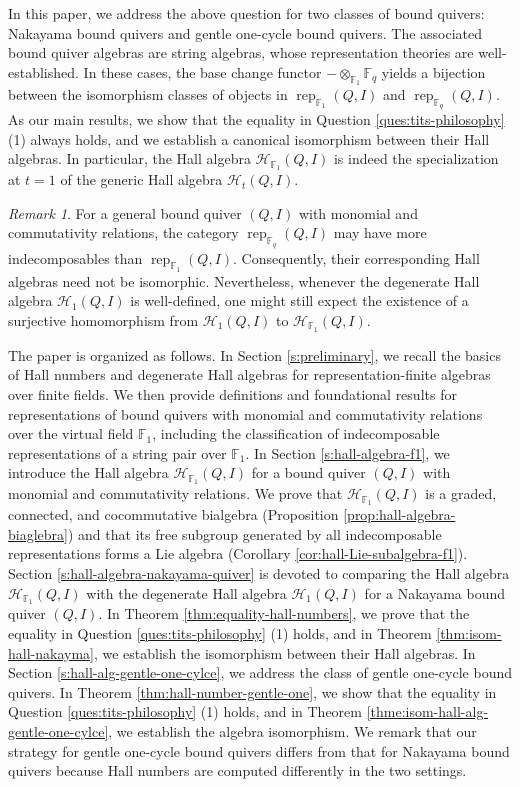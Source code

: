 \documentclass[12pt]{amsart}
\theoremstyle{remark}
\newtheorem{remark}[theorem]{Remark}
\theoremstyle{definition}
\numberwithin{equation}{section}
\begin{document}
In this paper, we address the above question for two classes of bound quivers: Nakayama bound quivers and gentle one-cycle bound quivers. The associated bound quiver algebras are string algebras, whose representation theories are well-established. In these cases, the base change functor $-\otimes_{\mathbb{F}_1}\mathbb{F}_q$ yields a bijection between the isomorphism classes of objects in $\operatorname{rep}_{\mathbb{F}_1}(Q,I)$ and $\operatorname{rep}_{\mathbb{F}_q}(Q,I)$. As our main results, we show that the equality in Question \ref{ques:tits-philosophy} (1) always holds, and we establish a canonical isomorphism between their Hall algebras. In particular, the Hall algebra $\mathcal{H}_{\mathbb{F}_1}(Q,I)$ is indeed the specialization at $t=1$ of the generic Hall algebra $\mathcal{H}_t(Q,I)$.
\begin{remark}
    For a general bound quiver $(Q,I)$ with monomial and commutativity relations, the category $\operatorname{rep}_{\mathbb{F}_q}(Q,I)$ may have  more indecomposables than  $\operatorname{rep}_{\mathbb{F}_1}(Q,I)$. Consequently, their corresponding Hall algebras need not be isomorphic. Nevertheless, whenever the degenerate Hall algebra $\mathcal{H}_1(Q,I)$ is well-defined, one might still expect the existence of a surjective homomorphism from $\mathcal{H}_1(Q,I)$ to $\mathcal{H}_{\mathbb{F}_1}(Q,I)$.
\end{remark}


The paper is organized as follows. In Section \ref{s:preliminary}, we recall the basics of Hall numbers and degenerate Hall algebras for representation-finite algebras over finite fields. We then provide definitions and foundational results for representations of bound quivers with monomial and commutativity relations over the virtual field $\mathbb{F}_1$, including the classification of indecomposable representations of a string pair over $\mathbb{F}_1$. In Section \ref{s:hall-algebra-f1}, we introduce the Hall algebra $\mathcal{H}_{\mathbb{F}_1}(Q,I)$ for a bound quiver $(Q,I)$ with monomial and commutativity relations. We prove that $\mathcal{H}_{\mathbb{F}_1}(Q,I)$ is a graded, connected, and cocommutative bialgebra (Proposition \ref{prop:hall-algebra-biaglebra}) and that its free subgroup generated by all indecomposable representations forms a Lie algebra (Corollary \ref{cor:hall-Lie-subalgebra-f1}). Section \ref{s:hall-algebra-nakayama-quiver} is devoted to comparing the Hall algebra $\mathcal{H}_{\mathbb{F}_1}(Q,I)$ with the degenerate Hall algebra $\mathcal{H}_1(Q,I)$ for a Nakayama bound quiver $(Q,I)$. In Theorem \ref{thm:equality-hall-numbers}, we prove that the equality in Question \ref{ques:tits-philosophy} (1) holds, and in Theorem \ref{thm:isom-hall-nakayma}, we establish the isomorphism between their Hall algebras. In Section \ref{s:hall-alg-gentle-one-cylce}, we address the class of gentle one-cycle bound quivers. In Theorem \ref{thm:hall-number-gentle-one}, we show that the equality in Question \ref{ques:tits-philosophy} (1) holds, and in Theorem \ref{thme:isom-hall-alg-gentle-one-cylce}, we establish the algebra isomorphism. We remark that our strategy for gentle one-cycle bound quivers differs from that for Nakayama bound quivers because Hall numbers are computed differently in the two settings.
\end{document}

